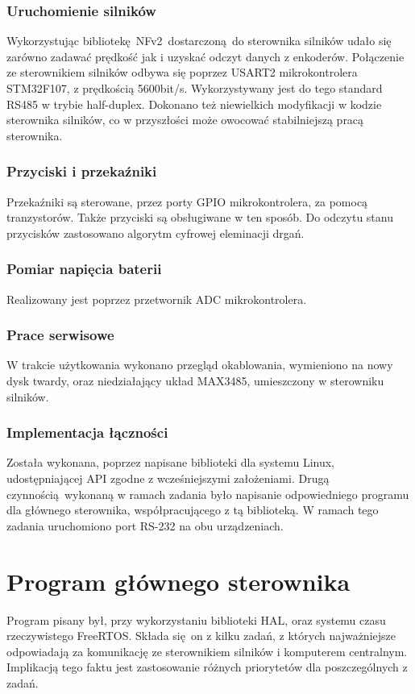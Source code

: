 \documentclass[10pt,a4paper]{article}
\begin{document}
	\subsubsection{Uruchomienie silników}
	Wykorzystując bibliotekę NFv2 dostarczoną do sterownika silników udało się zarówno zadawać prędkość jak i uzyskać odczyt danych z enkoderów. Połączenie ze sterownikiem silników odbywa się poprzez USART2 mikrokontrolera STM32F107, z prędkością 5600bit/s. Wykorzystywany jest do tego standard RS485 w trybie half-duplex. Dokonano też niewielkich modyfikacji w kodzie sterownika silników, co w przyszłości może owocować stabilniejszą pracą sterownika.
	\subsubsection{Przyciski i przekaźniki}
	Przekaźniki są sterowane, przez porty GPIO mikrokontrolera, za pomocą tranzystorów. Także przyciski są obsługiwane w ten sposób. Do odczytu stanu przycisków zastosowano algorytm cyfrowej eleminacji drgań.
	\subsubsection{Pomiar napięcia baterii}
	Realizowany jest poprzez przetwornik ADC mikrokontrolera.
	\subsubsection{Prace serwisowe}
	W trakcie użytkowania wykonano przegląd okablowania, wymieniono na nowy dysk twardy, oraz niedziałający układ MAX3485, umieszczony w sterowniku silników.
	\subsubsection{Implementacja łączności}
	Została wykonana, poprzez napisane biblioteki dla systemu Linux, udostępniającej API zgodne z wcześniejszymi założeniami. Drugą czynnością wykonaną w ramach zadania było napisanie odpowiedniego programu dla głównego sterownika, współpracującego z tą biblioteką. W ramach tego zadania uruchomiono port RS-232 na obu urządzeniach.
	
	\section{Program głównego sterownika}
	Program pisany był, przy wykorzystaniu biblioteki HAL, oraz systemu czasu rzeczywistego FreeRTOS. Składa się on z kilku zadań, z których najważniejsze odpowiadają za komunikację ze sterownikiem silników i komputerem centralnym. Implikacją tego faktu jest zastosowanie różnych priorytetów dla poszczególnych z zadań.
\end{document}
